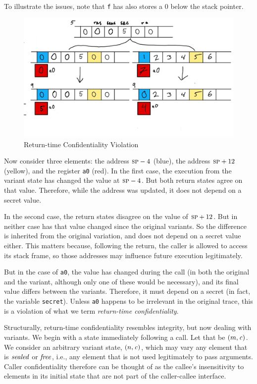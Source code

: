 \documentclass[10pt,conference]{ieeetran}%
\theoremstyle{definition}
\begin{document}
To illustrate the issues, note that {\tt f} has also stores a 0 below the stack pointer.
%
\begin{figure}
  \includegraphics[width=\columnwidth]{variants3.png}
  \caption{Return-time Confidentiality Violation}
  \label{fig:variant3}
\end{figure}
%
Now consider three elements: the address \(\textsc{sp} - 4\) (blue), the address \(\textsc{sp} + 12\) (yellow),
and the register {\tt a0} (red). In the first case, the execution from the variant state
has changed the value at \(\textsc{sp} - 4\). But both return states agree on that value. Therefore,
while the address was updated, it does not depend on a secret value.

In the second case, the return states disagree on the value of \(\textsc{sp} + 12\). But in neither
case has that value changed since the original variants. So the difference is inherited from
the original variation, and does not depend on a secret value either. This matters because,
following the return, the caller is allowed to access its stack frame, so those addresses
may influence future execution legitimately.

But in the case of {\tt a0}, the value has changed during the call (in both the original
and the variant, although only one of these would be necessary), and its final value differs between the variants.
Therefore, it must depend on a secret (in fact, the variable {\tt secret}).
Unless {\tt a0} happens to be irrelevant in the original trace, this is a violation of what
we term {\it return-time confidentiality}.

Structurally, return-time confidentiality resembles integrity, but now dealing with
variants. We begin with a state immediately following
a call. Let that be \((m,\mathit{c})\).  We consider an arbitrary variant state,
\((n,\mathit{c})\), which may vary any element that is \(\mathit{sealed}\) or \(\mathit{free}\), 
i.e., any element that is not used legitimately to pass arguments. Caller confidentiality
therefore can be thought of as the callee's insensitivity to elements in its initial state
that are not part of the caller-callee interface.
\end{document}
